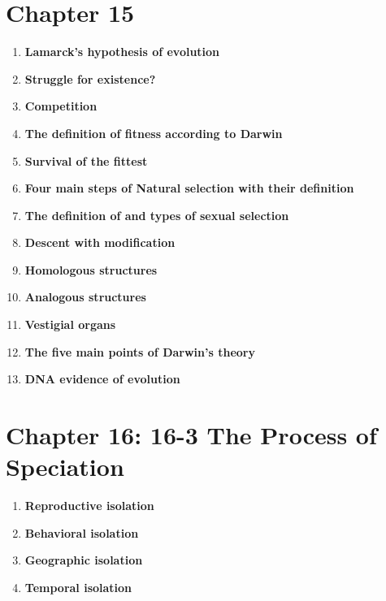 \documentclass[9pt]{article}
\begin{document}
\section*{Chapter 15}
\begin{enumerate}
  \item {\bf Lamarck's hypothesis of evolution}
  \item {\bf Struggle for existence?}
  \item {\bf Competition}
  \item {\bf The definition of fitness according to Darwin}
  \item {\bf Survival of the fittest}
  \item {\bf Four main steps of Natural selection with their definition}
  \item {\bf The definition of and types of sexual selection}
  \item {\bf Descent with modification}
  \item {\bf Homologous structures}
  \item {\bf Analogous structures}
  \item {\bf Vestigial organs}
  \item {\bf The five main points of Darwin's theory}
  \item {\bf DNA evidence of evolution}
\end{enumerate}
\section*{Chapter 16: 16-3 The Process of Speciation}
\begin{enumerate}
  \item {\bf Reproductive isolation}
  \item {\bf Behavioral isolation}
  \item {\bf Geographic isolation}
  \item {\bf Temporal isolation}
\end{enumerate}
\end{document}
